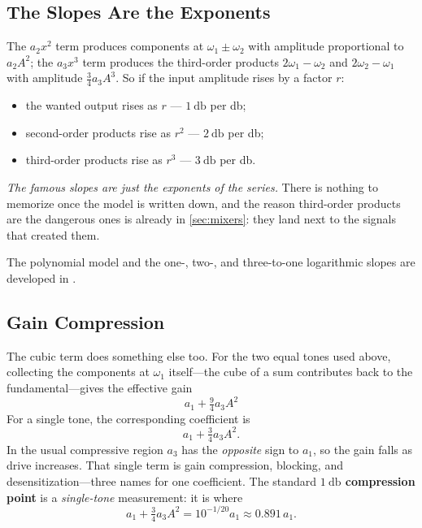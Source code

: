 \subsection{The Slopes Are the Exponents}
The \(a_2x^2\) term produces components at \(\omega_1\pm\omega_2\) with amplitude
proportional to \(a_2A^2\); the \(a_3x^3\) term produces the third-order products
\(2\omega_1-\omega_2\) and \(2\omega_2-\omega_1\) with amplitude
\(\tfrac34a_3A^3\). So if the input amplitude rises by a factor \(r\):
\begin{itemize}
\item the wanted output rises as \(r\) --- \(\SI{1}{\decibel}\) per \si{\decibel};
\item second-order products rise as \(r^2\) --- \(\SI{2}{\decibel}\) per \si{\decibel};
\item third-order products rise as \(r^3\) --- \(\SI{3}{\decibel}\) per \si{\decibel}.
\end{itemize}
\emph{The famous slopes are just the exponents of the series.} There is nothing to
memorize once the model is written down, and the reason third-order products are the
dangerous ones is already in \cref{sec:mixers}: they land next to the signals that
created them.

The polynomial model and the one-, two-, and three-to-one logarithmic slopes are
developed in \cite[pp.~89--103]{egan2003practical}.

\subsection{Gain Compression}
\label{sec:compression}
The cubic term does something else too. For the two equal tones used above,
collecting the components at \(\omega_1\) itself---the cube of a sum contributes
back to the fundamental---gives the effective gain
\[
a_1+\tfrac94a_3A^2
\]
For a single tone, the corresponding coefficient is
\[
a_1+\tfrac34a_3A^2.
\]
In the usual compressive region \(a_3\) has the \emph{opposite} sign to \(a_1\), so
the gain falls as drive increases. That single term is gain compression, blocking, and
desensitization---three names for one coefficient. The standard
\textbf{\(\SI{1}{\decibel}\) compression point} is a \emph{single-tone}
measurement: it is where
\[
a_1+\tfrac34a_3A^2=10^{-1/20}a_1\approx0.891\,a_1.
\]

